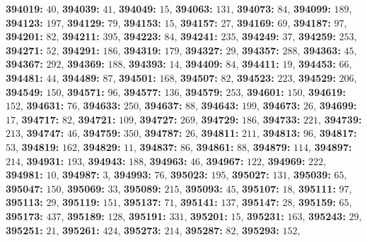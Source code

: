 \textsf{\bfseries 394019:} $40$, \textsf{\bfseries 394039:} $41$, \textsf{\bfseries 394049:} $15$, \textsf{\bfseries 394063:} $131$, \textsf{\bfseries 394073:} $84$, \textsf{\bfseries 394099:} $189$, \textsf{\bfseries 394123:} $197$, \textsf{\bfseries 394129:} $79$, \textsf{\bfseries 394153:} $15$, \textsf{\bfseries 394157:} $27$, \textsf{\bfseries 394169:} $69$, \textsf{\bfseries 394187:} $97$, \textsf{\bfseries 394201:} $82$, \textsf{\bfseries 394211:} $395$, \textsf{\bfseries 394223:} $84$, \textsf{\bfseries 394241:} $235$, \textsf{\bfseries 394249:} $37$, \textsf{\bfseries 394259:} $253$, \textsf{\bfseries 394271:} $52$, \textsf{\bfseries 394291:} $186$, \textsf{\bfseries 394319:} $179$, \textsf{\bfseries 394327:} $29$, \textsf{\bfseries 394357:} $288$, \textsf{\bfseries 394363:} $45$, \textsf{\bfseries 394367:} $292$, \textsf{\bfseries 394369:} $188$, \textsf{\bfseries 394393:} $14$, \textsf{\bfseries 394409:} $84$, \textsf{\bfseries 394411:} $19$, \textsf{\bfseries 394453:} $66$, \textsf{\bfseries 394481:} $44$, \textsf{\bfseries 394489:} $87$, \textsf{\bfseries 394501:} $168$, \textsf{\bfseries 394507:} $82$, \textsf{\bfseries 394523:} $223$, \textsf{\bfseries 394529:} $206$, \textsf{\bfseries 394549:} $150$, \textsf{\bfseries 394571:} $96$, \textsf{\bfseries 394577:} $136$, \textsf{\bfseries 394579:} $253$, \textsf{\bfseries 394601:} $150$, \textsf{\bfseries 394619:} $152$, \textsf{\bfseries 394631:} $76$, \textsf{\bfseries 394633:} $250$, \textsf{\bfseries 394637:} $88$, \textsf{\bfseries 394643:} $199$, \textsf{\bfseries 394673:} $26$, \textsf{\bfseries 394699:} $17$, \textsf{\bfseries 394717:} $82$, \textsf{\bfseries 394721:} $109$, \textsf{\bfseries 394727:} $269$, \textsf{\bfseries 394729:} $186$, \textsf{\bfseries 394733:} $221$, \textsf{\bfseries 394739:} $213$, \textsf{\bfseries 394747:} $46$, \textsf{\bfseries 394759:} $350$, \textsf{\bfseries 394787:} $26$, \textsf{\bfseries 394811:} $211$, \textsf{\bfseries 394813:} $96$, \textsf{\bfseries 394817:} $53$, \textsf{\bfseries 394819:} $162$, \textsf{\bfseries 394829:} $11$, \textsf{\bfseries 394837:} $86$, \textsf{\bfseries 394861:} $88$, \textsf{\bfseries 394879:} $114$, \textsf{\bfseries 394897:} $214$, \textsf{\bfseries 394931:} $193$, \textsf{\bfseries 394943:} $188$, \textsf{\bfseries 394963:} $46$, \textsf{\bfseries 394967:} $122$, \textsf{\bfseries 394969:} $222$, \textsf{\bfseries 394981:} $10$, \textsf{\bfseries 394987:} $3$, \textsf{\bfseries 394993:} $76$, \textsf{\bfseries 395023:} $195$, \textsf{\bfseries 395027:} $131$, \textsf{\bfseries 395039:} $65$, \textsf{\bfseries 395047:} $150$, \textsf{\bfseries 395069:} $33$, \textsf{\bfseries 395089:} $215$, \textsf{\bfseries 395093:} $45$, \textsf{\bfseries 395107:} $18$, \textsf{\bfseries 395111:} $97$, \textsf{\bfseries 395113:} $29$, \textsf{\bfseries 395119:} $151$, \textsf{\bfseries 395137:} $71$, \textsf{\bfseries 395141:} $137$, \textsf{\bfseries 395147:} $28$, \textsf{\bfseries 395159:} $65$, \textsf{\bfseries 395173:} $437$, \textsf{\bfseries 395189:} $128$, \textsf{\bfseries 395191:} $331$, \textsf{\bfseries 395201:} $15$, \textsf{\bfseries 395231:} $163$, \textsf{\bfseries 395243:} $29$, \textsf{\bfseries 395251:} $21$, \textsf{\bfseries 395261:} $424$, \textsf{\bfseries 395273:} $214$, \textsf{\bfseries 395287:} $82$, \textsf{\bfseries 395293:} $152$, 

